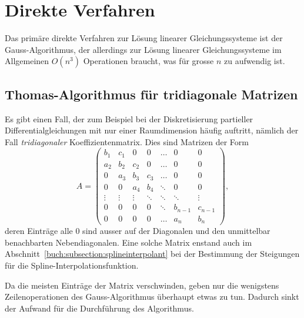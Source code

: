 %
%
%
\section{Direkte Verfahren
\label{buch:section:direkt}}
Das primäre direkte Verfahren zur Lösung linearer Gleichungssysteme ist
der Gauss-Algorithmus, der allerdings
zur Lösung linearer Gleichungssysteme im Allgemeinen $O(n^3)$
Operationen braucht, was für grosse $n$ zu aufwendig ist.
%

%
%

\subsection{Thomas-Algorithmus für tridiagonale Matrizen
\label{buch:subsection:thomasalgorithmus}}
Es gibt einen Fall, der zum Beispiel bei der Diskretisierung
partieller Differentialgleichungen mit nur einer Raumdimension
häufig auftritt, nämlich der Fall {\em tridiagonaler} Koeffizientenmatrix.
%
Dies sind Matrizen der Form
\begin{equation}
A
=
\begin{pmatrix}
b_1   & c_1   &  0    &  0    &\dots  &  0    &  0     \\
a_2   & b_2   & c_2   &  0    &\dots  &  0    &  0     \\
 0    & a_3   & b_3   & c_3   &\dots  &  0    &  0     \\
 0    &  0    & a_4   & b_4   &\ddots &  0    &  0     \\
\vdots&\vdots &\vdots &\ddots &\ddots &\ddots &\vdots  \\
 0    &  0    &  0    &  0    &\ddots &b_{n-1}&c_{n-1} \\
 0    &  0    &  0    &  0    &\dots  &a_{n}  &b_n
\end{pmatrix},
\end{equation}
deren Einträge alle $0$ sind ausser auf der Diagonalen und den unmittelbar
benachbarten Nebendiagonalen.
%
Eine solche Matrix enstand auch im
Abschnitt~\ref{buch:subsection:splineinterpolant}
bei der Bestimmung der Steigungen für die Spline-Interpolationsfunktion.
%

Da die meisten Einträge der Matrix verschwinden, geben nur die wenigstens
Zeilenoperationen des Gauss-Algorithmus überhaupt etwas zu tun.
Dadurch sinkt der Aufwand für die Durchführung des Algorithmus.
%
%

